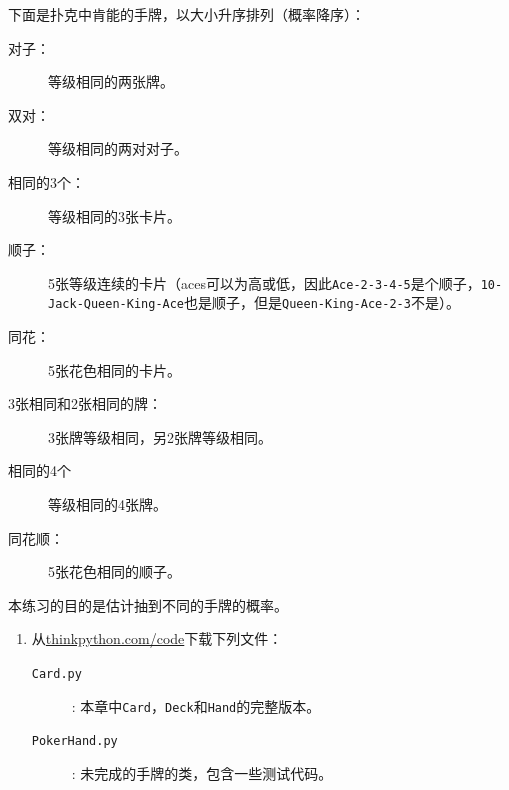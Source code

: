 \begin{ex}

下面是扑克中肯能的手牌，以大小升序排列（概率降序）：

\begin{description}

\item[对子：] 等级相同的两张牌。
\vspace{-0.05in}

\item[双对：] 等级相同的两对对子。
\vspace{-0.05in}

\item[相同的3个：] 等级相同的3张卡片。
\vspace{-0.05in}

\item[顺子：] 5张等级连续的卡片（aces可以为高或低，因此{\tt Ace-2-3-4-5}是个顺子，{\tt 10-Jack-Queen-King-Ace}也是顺子，但是{\tt Queen-King-Ace-2-3}不是）。
\vspace{-0.05in}

\item[同花：] 5张花色相同的卡片。
\vspace{-0.05in}

\item[3张相同和2张相同的牌：] 3张牌等级相同，另2张牌等级相同。
\vspace{-0.05in}

\item[相同的4个] 等级相同的4张牌。
\vspace{-0.05in}

\item[同花顺：] 5张花色相同的顺子。
\vspace{-0.05in}

\end{description}
%
本练习的目的是估计抽到不同的手牌的概率。

\begin{enumerate}

\item 从\url{thinkpython.com/code}下载下列文件：

\begin{description}

\item[{\tt Card.py}]: 本章中{\tt Card}，{\tt Deck}和{\tt Hand}的完整版本。

\item[{\tt PokerHand.py}]: 未完成的手牌的类，包含一些测试代码。


\end{description}
\end{enumerate}
\end{ex}
